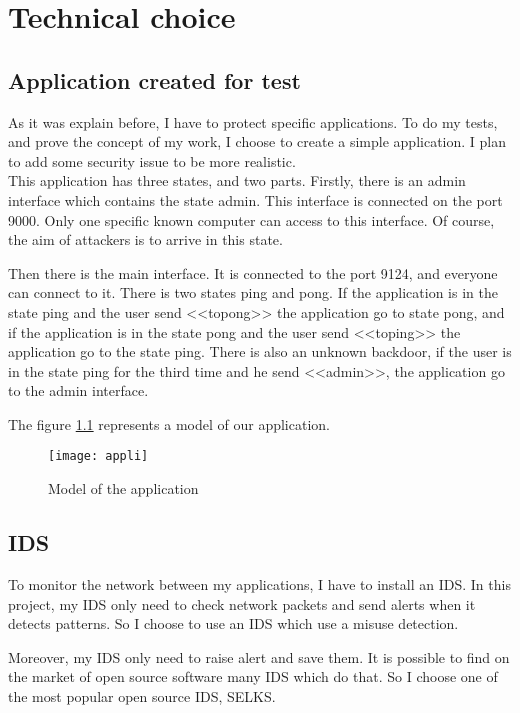 
\chapter{Technical choice}
\label{chap:choice}

\section{Application created for test}

As it was explain before, I have to protect specific applications. To do my tests, and prove the concept of my
work, I choose to create a simple application. I plan to add some security issue to be more realistic.~\\


This application has three states, and two parts. Firstly, there is an admin interface which contains the state
admin. This interface is connected on the port 9000. Only one specific known computer can access to this interface.
Of course, the aim of attackers is to arrive in this state.

Then there is the main interface. It is connected to the port 9124, and everyone can connect to it. There is two
states ping and pong. If the application is in the state ping and the user send <<topong>> the application go to
state pong, and if the application is in the state pong and the user send <<toping>> the application go to the
state ping. There is also an unknown backdoor, if the user is in the state ping for the third time and he send
<<admin>>, the application go to the admin interface.

The figure \ref{fig:appli} represents a model of our application.


\begin{figure}[!h]
  \centering
  \texttt{[image: appli]}
  \caption{Model of the application}
  \label{fig:appli}
\end{figure}

\section{IDS}

To monitor the network between my applications, I have to install an IDS. In this project, my IDS only need to
check network packets and send alerts when it detects patterns. So I choose to use an IDS which use a misuse
detection.

Moreover, my IDS only need to raise alert and save them. It is possible to find on the market of open source
software many IDS which do that. So I choose one of the most popular open source IDS, SELKS.

